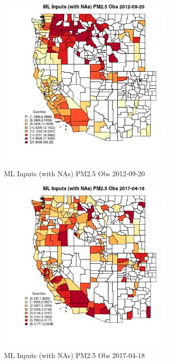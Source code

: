 \begin{figure} 
\centering  
\includegraphics[width=0.77\textwidth]{Code_Outputs/Report_ML_input_PM25_Step4_part_e_de_duplicated_aves_compiled_2019-05-14wNAs_CountyPM25_ObsMean2012-09-20_2012-09-20.jpg} 
\caption{\label{fig:Report_ML_input_PM25_Step4_part_e_de_duplicated_aves_compiled_2019-05-14wNAsCountyPM25_ObsMean2012-09-20_2012-09-20}ML Inputs (with NAs) PM2.5 Obs 2012-09-20} 
\end{figure} 
 

\begin{figure} 
\centering  
\includegraphics[width=0.77\textwidth]{Code_Outputs/Report_ML_input_PM25_Step4_part_e_de_duplicated_aves_compiled_2019-05-14wNAs_CountyPM25_ObsMean2017-04-18_2017-04-18.jpg} 
\caption{\label{fig:Report_ML_input_PM25_Step4_part_e_de_duplicated_aves_compiled_2019-05-14wNAsCountyPM25_ObsMean2017-04-18_2017-04-18}ML Inputs (with NAs) PM2.5 Obs 2017-04-18} 
\end{figure} 
 

